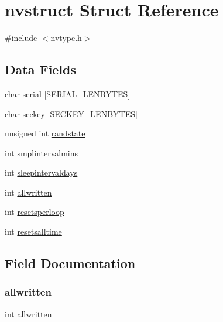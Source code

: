\hypertarget{structnvstruct}{}\section{nvstruct Struct Reference}
\label{structnvstruct}


{\ttfamily \#include $<$nvtype.\+h$>$}

\subsection*{Data Fields}
\begin{DoxyCompactItemize}
\item 
char \mbox{\hyperlink{structnvstruct_a8c4928cc85c5336514401eb142ea7d50}{serial}} \mbox{[}\mbox{\hyperlink{nvtype_8h_a09589b0f4cf4e32679b6dc064903edef}{S\+E\+R\+I\+A\+L\+\_\+\+L\+E\+N\+B\+Y\+T\+ES}}\mbox{]}
\item 
char \mbox{\hyperlink{structnvstruct_a680c038327bbd20d30beade8d0ef1dd4}{seckey}} \mbox{[}\mbox{\hyperlink{nvtype_8h_ae32c9007f59a1d55426d7fd63e10d589}{S\+E\+C\+K\+E\+Y\+\_\+\+L\+E\+N\+B\+Y\+T\+ES}}\mbox{]}
\item 
unsigned int \mbox{\hyperlink{structnvstruct_aec7e67f64e6ee88dda940f1b837f9351}{randstate}}
\item 
int \mbox{\hyperlink{structnvstruct_a4447bd6767bd8a45338bdeeae4cb0511}{smplintervalmins}}
\item 
int \mbox{\hyperlink{structnvstruct_afd55ea1fa18fbe9ef04251bbf4948e7b}{sleepintervaldays}}
\item 
int \mbox{\hyperlink{structnvstruct_a8132fd6a69b2f8b51c2e9241f29de2ba}{allwritten}}
\item 
int \mbox{\hyperlink{structnvstruct_a05c6c8c50f3add0b2ba801d67177d0a5}{resetsperloop}}
\item 
int \mbox{\hyperlink{structnvstruct_a296b1120c7c1a2be3bdb81ef5d02d1b5}{resetsalltime}}
\end{DoxyCompactItemize}


\subsection{Field Documentation}
\mbox{\label{structnvstruct_a8132fd6a69b2f8b51c2e9241f29de2ba}} 
\subsubsection{\texorpdfstring{allwritten}{allwritten}}
{\footnotesize\ttfamily int allwritten}

